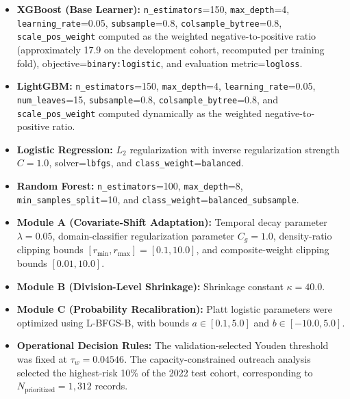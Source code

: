 \documentclass[a4paper,fleqn]{cas-sc}
\begin{document}
{\raggedright\sloppy
\begin{itemize}
    \item \textbf{XGBoost (Base Learner):} \texttt{n\_estimators}=150, \texttt{max\_depth}=4, \texttt{learning\_rate}=0.05, \texttt{subsample}=0.8, \texttt{colsample\_bytree}=0.8, \texttt{scale\_pos\_weight} computed as the weighted negative-to-positive ratio (approximately 17.9 on the development cohort, recomputed per training fold), objective=\texttt{binary:logistic}, and evaluation metric=\texttt{logloss}.

    \item \textbf{LightGBM:} \texttt{n\_estimators}=150, \texttt{max\_depth}=4, \texttt{learning\_rate}=0.05, \texttt{num\_leaves}=15, \texttt{subsample}=0.8, \texttt{colsample\_bytree}=0.8, and \texttt{scale\_pos\_weight} computed dynamically as the weighted negative-to-positive ratio.

    \item \textbf{Logistic Regression:} $L_2$ regularization with inverse regularization strength $C=1.0$, solver=\texttt{lbfgs}, and \texttt{class\_weight}=\texttt{balanced}.

    \item \textbf{Random Forest:} \texttt{n\_estimators}=100, \texttt{max\_depth}=8, \texttt{min\_samples\_split}=10, and \texttt{class\_weight}=\texttt{balanced\_subsample}.

    \item \textbf{Module A (Covariate-Shift Adaptation):} Temporal decay parameter $\lambda=0.05$, domain-classifier regularization parameter $C_g=1.0$, density-ratio clipping bounds $[r_{\min},r_{\max}]=[0.1,10.0]$, and composite-weight clipping bounds $[0.01,10.0]$.

    \item \textbf{Module B (Division-Level Shrinkage):} Shrinkage constant $\kappa=40.0$.

    \item \textbf{Module C (Probability Recalibration):} Platt logistic parameters were optimized using L-BFGS-B, with bounds $a\in[0.1,5.0]$ and $b\in[-10.0,5.0]$.

    \item \textbf{Operational Decision Rules:} The validation-selected Youden threshold was fixed at $\tau_w=0.04546$. The capacity-constrained outreach analysis selected the highest-risk 10\% of the 2022 test cohort, corresponding to $N_{\text{prioritized}}=1{,}312$ records.
\end{itemize}}
\end{document}
